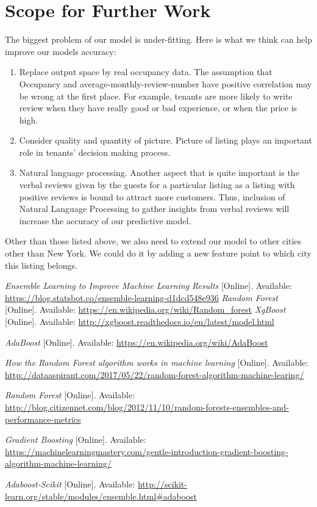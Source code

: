 \documentclass[12pt]{article}
\begin{document}
\section*{Scope for Further Work}
The biggest problem of our model is under-fitting. Here is what we think can help improve our models accuracy:
\begin{enumerate}
\item Replace output space by real occupancy data. The assumption that Occupancy  and average-monthly-review-number have positive correlation may be wrong at the first place. For example, tenants are more likely to write review when they have really good or bad experience, or when the price is high.
\item Consider quality and quantity of picture. Picture of listing plays an important role in tenants' decision making process.
\item Natural language processing. Another aspect that is quite important is the verbal reviews given by the guests for a particular listing as a listing with positive reviews is bound to attract more customers. Thus, inclusion of Natural Language Processing to gather insights from verbal reviews will increase the accuracy of our predictive model.
\end{enumerate}

\noindent Other than those listed above, we also need to extend our model to other cities other than New York. We could do it by adding a new feature point to which city this listing belongs.

\newpage
 \begin{thebibliography}{1}
 
     \textit{Ensemble Learning to Improve Machine Learning Results} [Online]. Available:
    \href{url}{https://blog.statsbot.co/ensemble-learning-d1dcd548e936}
      \textit{Random Forest} [Online]. Available: 
     \href{url}{https://en.wikipedia.org/wiki/Random\_forest}
     \textit{XgBoost} [Online]. Available:  \href{url}{http://xgboost.readthedocs.io/en/latest/model.html}
    
     \textit{AdaBoost} [Online]. Available: 
     \href{url}{https://en.wikipedia.org/wiki/AdaBoost}
     
      \textit{How the Random Forest algorithm works in machine learning} [Online]. Available: \href{url}{http://dataaspirant.com/2017/05/22/random-forest-algorithm-machine-learing/}
     
      \textit{Random Forest} [Online]. Available:
     \href{url}{http://blog.citizennet.com/blog/2012/11/10/random-forests-ensembles-and-performance-metrics}
     
      \textit{Gradient Boosting} [Online]. Available:
     \href{url}{https://machinelearningmastery.com/gentle-introduction-gradient-boosting-algorithm-machine-learning/}
  
      \textit{Adaboost-Scikit} [Online]. Available: \href{url}{http://scikit-learn.org/stable/modules/ensemble.html\#adaboost}
     
    
    
     \end{thebibliography}
\end{document}
